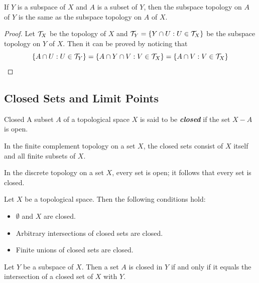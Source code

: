 \documentclass[12pt,a4paper]{article}
\begin{document}
    \begin{ex}
        If $Y$ is a subspace of $X$ and $A$ is a subset of $Y$, then the subspace topology on $A$ of $Y$ is the same as the subspace topology on $A$ of $X$.
    \end{ex}
    \begin{proof}
        Let $\mathcal{T}_X$ be the topology of $X$ and $\mathcal{T}_Y=\left\{Y\cap U: U\in\mathcal{T}_X\right\}$ be the subspace topology on $Y$ of $X$. Then it can be proved by noticing that
        $$
        \left\{A\cap U:U\in\mathcal{T}_Y\right\}=\left\{A\cap Y\cap V: V\in\mathcal{T}_X\right\}=\left\{A\cap V: V\in\mathcal{T}_X\right\}
        $$
    \end{proof}
    \hfill

    \subsection{Closed Sets and Limit Points}
    \begin{defi}{Closed}
        A subset $A$ of a topological space $X$ is said to be \textit{\textbf{closed}} if the set $X-A$ is open.
    \end{defi}
    \begin{eg}
        In the finite complement topology on a set $X$, the closed sets consist of $X$ itself and all finite subsets of $X$.
    \end{eg}
    \begin{eg}
        In the discrete topology on a set $X$, every set is open; it follows that every set is closed.
    \end{eg}
    \hfill

    \begin{thm}
        Let $X$ be a topological space. Then the following conditions hold:
        \begin{itemize}
            \item $\emptyset$ and $X$ are closed.
            \item Arbitrary intersections of closed sets are closed.
            \item Finite unions of closed sets are closed.
        \end{itemize}
    \end{thm}
    \hfill

    \begin{thm}
        Let $Y$ be a subspace of $X$. Then a set $A$ is closed in $Y$ if and only if it equals the intersection of a closed set of $X$ with $Y$.
    \end{thm}
    \hfill
\end{document}
